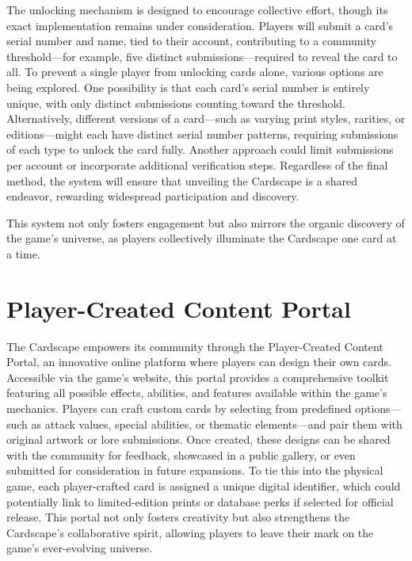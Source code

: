 The unlocking mechanism is designed to encourage collective effort, though its exact implementation remains under consideration. Players will submit a card’s serial number and name, tied to their account, contributing to a community threshold---for example, five distinct submissions---required to reveal the card to all. To prevent a single player from unlocking cards alone, various options are being explored. One possibility is that each card’s serial number is entirely unique, with only distinct submissions counting toward the threshold. Alternatively, different versions of a card---such as varying print styles, rarities, or editions---might each have distinct serial number patterns, requiring submissions of each type to unlock the card fully. Another approach could limit submissions per account or incorporate additional verification steps. Regardless of the final method, the system will ensure that unveiling the Cardscape is a shared endeavor, rewarding widespread participation and discovery.

This system not only fosters engagement but also mirrors the organic discovery of the game's universe, as players collectively illuminate the Cardscape one card at a time.





\section{Player-Created Content Portal}

The Cardscape empowers its community through the Player-Created Content Portal, an innovative online platform where players can design their own cards. Accessible via the game’s website, this portal provides a comprehensive toolkit featuring all possible effects, abilities, and features available within the game’s mechanics. Players can craft custom cards by selecting from predefined options---such as attack values, special abilities, or thematic elements---and pair them with original artwork or lore submissions. Once created, these designs can be shared with the community for feedback, showcased in a public gallery, or even submitted for consideration in future expansions. To tie this into the physical game, each player-crafted card is assigned a unique digital identifier, which could potentially link to limited-edition prints or database perks if selected for official release. This portal not only fosters creativity but also strengthens the Cardscape’s collaborative spirit, allowing players to leave their mark on the game’s ever-evolving universe.





